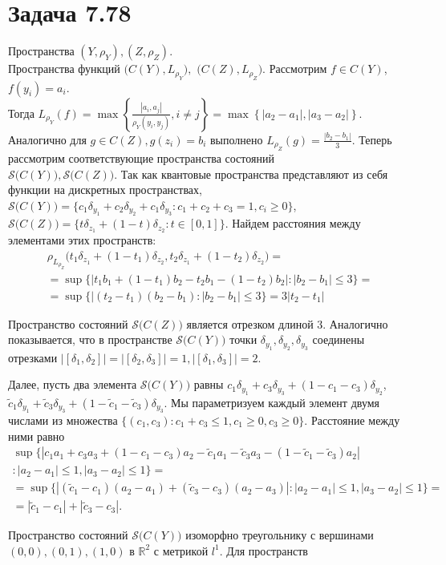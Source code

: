 \documentclass[a4paper,12pt]{article}
\date{\today}
\begin{document}
\section{Задача 7.78}
Пространства $ (Y,\rho_Y),(Z,\rho_Z) $. \\Пространства функций 
$ \big(C(Y),L_{\rho_Y}\big), $  $\big(C(Z),L_{\rho_Z}\big) $. Рассмотрим $ f\in C(Y) $, $ f(y_i)=a_i $.\\
Тогда $ L_{\rho_Y}(f) = \max\left\{\frac{|a_i,a_j|}{\rho_Y(y_i,y_j)},i\neq j\right\} = \max\left\{|a_2-a_1|,|a_3-a_2|\right\}$.\\
Аналогично для $ g\in C(Z), g(z_i) = b_i $ выполнено $ L_{\rho_Z}(g) = \frac{|b_2-b_1|}{3} .$
Теперь рассмотрим соответствующие пространства состояний\\ $ \mathcal{S}\big(C(Y)\big) ,\mathcal{S}\big(C(Z)\big)$. Так как квантовые пространства представляют из себя функции на дискретных пространствах, $ \mathcal{S}\big(C(Y)\big) = \{c_1 \delta_{y_1} + c_2 \delta_{y_2} + c_1 \delta_{y_3} \colon c_1+c_2+c_3=1, c_i\ge 0\}$,
$ \mathcal{S}\big(C(Z)\big) = \{t \delta_{z_1} + (1-t) \delta_{z_2}\colon t \in [0,1]\}$. Найдем расстояния между элементами этих пространств:
\begin{multline*}
  \rho_{L_{\rho_Z}}\big(t_1\delta_{z_1} + (1-t_1)\delta_{z_2},t_2\delta_{z_1} + (1-t_2)\delta_{z_2}\big) =\\
  = \sup\big\{|t_1b_1 + (1-t_1)b_2 - t_2b_1 - (1-t_2)b_2| \colon |b_2-b_1|\le 3\big\}=\\
  = \sup\big\{|(t_2-t_1)(b_2-b_1)\colon |b_2-b_1|\le 3\big\}=3|t_2-t_1|
\end{multline*}

Пространство состояний $ \mathcal{S}\big(C(Z)\big) $ является отрезком длиной $ 3 $. Аналогично показывается, что в пространстве $ \mathcal{S}\big(C(Y)\big) $ точки $ \delta_{y_1},\delta_{y_2},\delta_{y_3} $ соединены отрезками $ \big|\left[\delta_1,\delta_2\right]\big|=\big|\left[\delta_2,\delta_3\right]\big|=1,\big|\left[\delta_1,\delta_3\right]\big|=2 .$

Далее, пусть два элемента $ \mathcal{S}\big(C(Y)\big)$ равны $ c_1 \delta_{y_1} + c_3 \delta_{y_3}  + (1-c_1 - c_3)\delta_{y_2} $, $ \widetilde{c}_1 \delta_{y_1} + \widetilde{c}_3 \delta_{y_3}  + (1-\widetilde{c}_1 - \widetilde{c}_3)\delta_{y_3} $. Мы параметризуем каждый элемент двумя числами из множества $\{(c_1,c_3) \colon c_1 + c_3 \le 1, c_1\ge 0, c_3 \ge 0\}$. Расстояние между ними равно 
\begin{multline*}
  \sup\big\{|c_1 a_1 + c_3a_3+(1-c_1-c_3)a_2 - \widetilde{c}_1a_1-\widetilde{c}_3a_3 - (1-\widetilde{c}_1-\widetilde{c}_3)a_2|\\ \colon |a_2-a_1|\le1, |a_3-a_2|\le 1\big\} = \\
 = \sup\big\{|(\widetilde{c}_1 - c_1)(a_2-a_1) + (\widetilde{c}_3-c_3)(a_2-a_3)| \colon|a_2-a_1|\le1, |a_3-a_2|\le 1 \big\} =\\
  = |\widetilde{c}_1-c_1 |+| \widetilde{c}_3 - c_3|.
\end{multline*}  

Пространство состояний $ \mathcal{S}\big(C(Y)\big) $ изоморфно треугольнику с вершинами $(0,0),(0,1),(1,0)$ в $ \mathbb{R}^2 $ с метрикой $ l^1 $. 
Для пространств 
\end{document}
